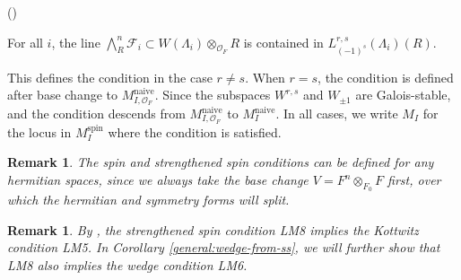\documentclass[pdflatex,sn-mathphys-num]{sn-jnl}%
\theoremstyle{thmstyleone}%
\theoremstyle{thmstyletwo}%
\newtheorem{remark}[subsubsection]{Remark}%
\numberwithin{equation}{subsection}
\theoremstyle{thmstylethree}%
\newcommand{\sF}{\ensuremath{\mathscr{F}}\xspace}
\newcommand{\CO}{\ensuremath{\mathcal{O}}\xspace}
\newcommand{\naive}{\ensuremath{\mathrm{naive}}\xspace}
\newcommand{\spin}{\ensuremath{\mathrm{spin}}\xspace}
\newenvironment{altenumerate}
	{\begin{list}
			{(\theenumi) }
			{\usecounter{enumi}
				\setlength{\labelwidth}{0pt}
				\setlength{\labelsep}{0pt}
				\setlength{\leftmargin}{0pt}
				\setlength{\itemsep}{\the\smallskipamount}
				\renewcommand{\theenumi}{\roman{enumi}}
		}}
		{\end{list}}
\begin{document}
\begin{altenumerate}
	\item[\fontfamily{cmtt}\selectfont LM8.]\label{moduli_ss:strengthened-spin} \quad For all $i$, the line
 $\bigwedge_R^n \sF_i \subset W(\Lambda_i)\otimes_{\CO_{F}}R$ is contained in $L^{r,s}_{(-1)^s}(\Lambda_i)(R).$
\end{altenumerate}
		
This defines the condition in the case $r \neq s$.  When $r = s$, the condition is defined after base change to $M_{I,\CO_F}^{\naive}$. Since the subspaces $W^{r,s}$ and $W_{\pm 1}$ are Galois-stable, and the condition descends from $M_{I,\CO_F}^\naive$ to $M_I^\naive$.  In all cases, we write $M_I$ for the locus in $M_I^\spin$ where the condition is satisfied.
		
\begin{remark}\label{moduli_ss:non-split-form}
The spin and strengthened spin conditions can be defined for \emph{any} hermitian spaces, 
since we always take the base change $V=F^n\otimes_{F_0}F$ first, over which the hermitian and symmetry forms will split.   
\end{remark}

\begin{remark}\label{moduli_ss:imply-kott}
By \cite[Lemma 5.1]{Smithling2015}, the strengthened spin condition {\selectfont LM8} implies the Kottwitz condition {\selectfont LM5}. 
In Corollary \ref{general:wedge-from-ss}, we will further show that {\selectfont LM8} also implies the wedge condition {\selectfont LM6}.
\end{remark}
\end{document}
